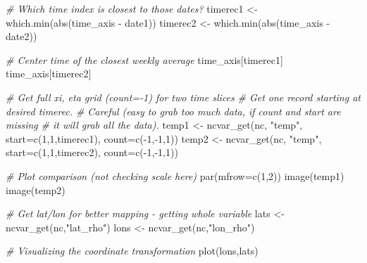 \documentclass[
]{article}
\newenvironment{Shaded}{\begin{snugshade}}{\end{snugshade}}
\newcommand{\AttributeTok}[1]{\textcolor[rgb]{0.77,0.63,0.00}{#1}}
\newcommand{\CommentTok}[1]{\textcolor[rgb]{0.56,0.35,0.01}{\textit{#1}}}
\newcommand{\DecValTok}[1]{\textcolor[rgb]{0.00,0.00,0.81}{#1}}
\newcommand{\FunctionTok}[1]{\textcolor[rgb]{0.00,0.00,0.00}{#1}}
\newcommand{\NormalTok}[1]{#1}
\newcommand{\OtherTok}[1]{\textcolor[rgb]{0.56,0.35,0.01}{#1}}
\newcommand{\SpecialCharTok}[1]{\textcolor[rgb]{0.00,0.00,0.00}{#1}}
\newcommand{\StringTok}[1]{\textcolor[rgb]{0.31,0.60,0.02}{#1}}
\begin{document}
\begin{Shaded}
\begin{Highlighting}[]
   \CommentTok{\# Which time index is closest to those dates?}
\NormalTok{   timerec1 }\OtherTok{\textless{}{-}} \FunctionTok{which.min}\NormalTok{(}\FunctionTok{abs}\NormalTok{(time\_axis }\SpecialCharTok{{-}}\NormalTok{ date1))}
\NormalTok{   timerec2 }\OtherTok{\textless{}{-}} \FunctionTok{which.min}\NormalTok{(}\FunctionTok{abs}\NormalTok{(time\_axis }\SpecialCharTok{{-}}\NormalTok{ date2))}

   \CommentTok{\# Center time of the closest weekly average}
\NormalTok{   time\_axis[timerec1]}
\NormalTok{   time\_axis[timerec2]}

   \CommentTok{\# Get full xi, eta grid (count={-}1) for two time slices}
   \CommentTok{\# Get one record starting at desired timerec.  }
   \CommentTok{\# Careful (easy to grab too much data, if count and start are missing}
   \CommentTok{\# it will grab all the data).}
\NormalTok{   temp1 }\OtherTok{\textless{}{-}} \FunctionTok{ncvar\_get}\NormalTok{(nc, }\StringTok{"temp"}\NormalTok{, }\AttributeTok{start=}\FunctionTok{c}\NormalTok{(}\DecValTok{1}\NormalTok{,}\DecValTok{1}\NormalTok{,timerec1), }\AttributeTok{count=}\FunctionTok{c}\NormalTok{(}\SpecialCharTok{{-}}\DecValTok{1}\NormalTok{,}\SpecialCharTok{{-}}\DecValTok{1}\NormalTok{,}\DecValTok{1}\NormalTok{))}
\NormalTok{   temp2 }\OtherTok{\textless{}{-}} \FunctionTok{ncvar\_get}\NormalTok{(nc, }\StringTok{"temp"}\NormalTok{, }\AttributeTok{start=}\FunctionTok{c}\NormalTok{(}\DecValTok{1}\NormalTok{,}\DecValTok{1}\NormalTok{,timerec2), }\AttributeTok{count=}\FunctionTok{c}\NormalTok{(}\SpecialCharTok{{-}}\DecValTok{1}\NormalTok{,}\SpecialCharTok{{-}}\DecValTok{1}\NormalTok{,}\DecValTok{1}\NormalTok{))}

   \CommentTok{\# Plot comparison (not checking scale here)}
   \FunctionTok{par}\NormalTok{(}\AttributeTok{mfrow=}\FunctionTok{c}\NormalTok{(}\DecValTok{1}\NormalTok{,}\DecValTok{2}\NormalTok{))}
   \FunctionTok{image}\NormalTok{(temp1)}
   \FunctionTok{image}\NormalTok{(temp2)}

   \CommentTok{\# Get lat/lon for better mapping {-} getting whole variable }
\NormalTok{   lats }\OtherTok{\textless{}{-}} \FunctionTok{ncvar\_get}\NormalTok{(nc,}\StringTok{"lat\_rho"}\NormalTok{)}
\NormalTok{   lons }\OtherTok{\textless{}{-}} \FunctionTok{ncvar\_get}\NormalTok{(nc,}\StringTok{"lon\_rho"}\NormalTok{)}

   \CommentTok{\# Visualizing the coordinate transformation }
   \FunctionTok{plot}\NormalTok{(lons,lats)}


\end{Highlighting}
\end{Shaded}
\end{document}
